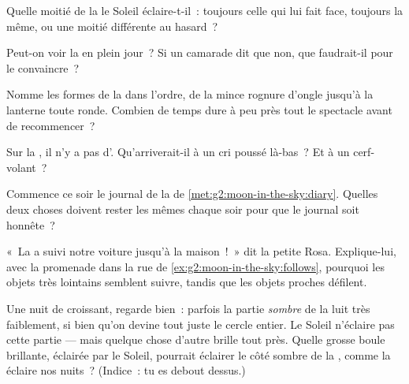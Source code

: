 \begin{exercise}[$\star$]\label{exo:g2:moon-in-the-sky:4}
Quelle moitié de la  le Soleil éclaire-t-il~: toujours celle qui
lui fait face, toujours la même, ou une moitié différente au hasard~?
\end{exercise}

\begin{exercise}[$\star$]\label{exo:g2:moon-in-the-sky:5}
Peut-on voir la  en plein jour~? Si un camarade dit que non, que
faudrait-il pour le convaincre~?
\end{exercise}

\begin{exercise}[$\star$]\label{exo:g2:moon-in-the-sky:6}
Nomme les formes de la  dans l'ordre, de la mince rognure d'ongle
jusqu'à la lanterne toute ronde. Combien de temps dure à peu près
tout le spectacle avant de recommencer~?
\end{exercise}

\begin{exercise}[$\star$]\label{exo:g2:moon-in-the-sky:7}
Sur la , il n'y a pas d'. Qu'arriverait-il à un cri poussé
là-bas~? Et à un cerf-volant~?
\end{exercise}

\begin{exercise}[$\star$]\label{exo:g2:moon-in-the-sky:8}
Commence ce soir le journal de la  de
\cref{met:g2:moon-in-the-sky:diary}. Quelles deux choses doivent
rester les mêmes chaque soir pour que le journal soit honnête~?
\end{exercise}

\begin{exercise}[$\star\star$]\label{exo:g2:moon-in-the-sky:9}
«~La  a suivi notre voiture jusqu'à la maison~!~» dit la petite
Rosa. Explique-lui, avec la promenade dans la rue de
\cref{ex:g2:moon-in-the-sky:follows}, pourquoi les objets très
lointains semblent suivre, tandis que les objets proches défilent.
\end{exercise}

\begin{exercise}[$\star\star$]\label{exo:g2:moon-in-the-sky:10}
Une nuit de croissant, regarde bien~: parfois la partie \emph{sombre}
de la  luit très faiblement, si bien qu'on devine tout juste le
cercle entier. Le Soleil n'éclaire pas cette partie --- mais quelque
chose d'autre brille tout près. Quelle grosse boule brillante,
éclairée par le Soleil, pourrait éclairer le côté sombre de la ,
comme la  éclaire nos nuits~? (Indice~: tu es debout dessus.)
\end{exercise}
